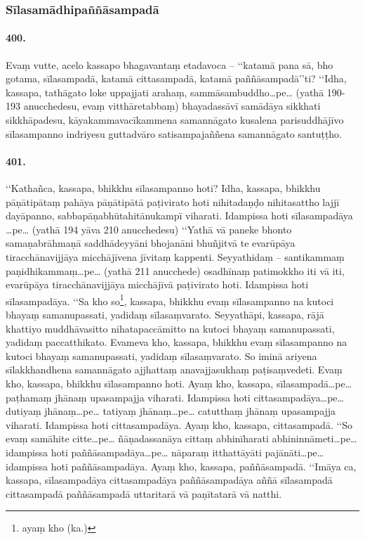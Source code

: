 \subsubsection{Sīlasamādhipaññāsampadā}

\paragraph{400.} Evaṃ vutte, acelo kassapo bhagavantaṃ etadavoca – ‘‘katamā pana sā, bho gotama, sīlasampadā, katamā cittasampadā, katamā paññāsampadā’’ti? ‘‘Idha, kassapa, tathāgato loke uppajjati arahaṃ, sammāsambuddho…pe… (yathā 190-193 anucchedesu, evaṃ vitthāretabbaṃ) bhayadassāvī samādāya sikkhati sikkhāpadesu, kāyakammavacīkammena samannāgato kusalena parisuddhājīvo sīlasampanno indriyesu guttadvāro satisampajaññena samannāgato santuṭṭho.

\paragraph{401.} ‘‘Kathañca, kassapa, bhikkhu sīlasampanno hoti? Idha, kassapa, bhikkhu pāṇātipātaṃ pahāya pāṇātipātā paṭivirato hoti nihitadaṇḍo nihitasattho lajjī dayāpanno, sabbapāṇabhūtahitānukampī viharati. Idampissa hoti sīlasampadāya …pe… (yathā 194 yāva 210 anucchedesu) ‘‘Yathā vā paneke bhonto samaṇabrāhmaṇā saddhādeyyāni bhojanāni bhuñjitvā te evarūpāya tiracchānavijjāya micchājīvena jīvitaṃ kappenti. Seyyathidaṃ – santikammaṃ paṇidhikammaṃ…pe… (yathā 211 anucchede) osadhīnaṃ patimokkho iti vā iti, evarūpāya tiracchānavijjāya micchājīvā paṭivirato hoti. Idampissa hoti sīlasampadāya. ‘‘Sa kho so\footnote{ayaṃ kho (ka.)}, kassapa, bhikkhu evaṃ sīlasampanno na kutoci bhayaṃ samanupassati, yadidaṃ sīlasaṃvarato. Seyyathāpi, kassapa, rājā khattiyo muddhāvasitto nihatapaccāmitto na kutoci bhayaṃ samanupassati, yadidaṃ paccatthikato. Evameva kho, kassapa, bhikkhu evaṃ sīlasampanno na kutoci bhayaṃ samanupassati, yadidaṃ sīlasaṃvarato. So iminā ariyena sīlakkhandhena samannāgato ajjhattaṃ anavajjasukhaṃ paṭisaṃvedeti. Evaṃ kho, kassapa, bhikkhu sīlasampanno hoti. Ayaṃ kho, kassapa, sīlasampadā…pe… paṭhamaṃ jhānaṃ upasampajja viharati. Idampissa hoti cittasampadāya…pe… dutiyaṃ jhānaṃ…pe… tatiyaṃ jhānaṃ…pe… catutthaṃ jhānaṃ upasampajja viharati. Idampissa hoti cittasampadāya. Ayaṃ kho, kassapa, cittasampadā. ‘‘So evaṃ samāhite citte…pe… ñāṇadassanāya cittaṃ abhinīharati abhininnāmeti…pe… idampissa hoti paññāsampadāya…pe… nāparaṃ itthattāyāti pajānāti…pe… idampissa hoti paññāsampadāya. Ayaṃ kho, kassapa, paññāsampadā. ‘‘Imāya ca, kassapa, sīlasampadāya cittasampadāya paññāsampadāya aññā sīlasampadā cittasampadā paññāsampadā uttaritarā vā paṇītatarā vā natthi. 
